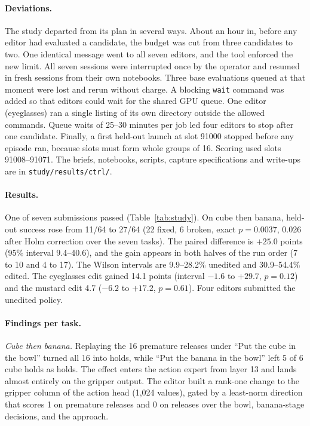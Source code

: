 \documentclass{article}
\begin{document}
\paragraph{Deviations.} The study departed from its plan in several ways. About an hour in, before any editor had evaluated a candidate, the budget was cut from three candidates to two. One identical message went to all seven editors, and the tool enforced the new limit. All seven sessions were interrupted once by the operator and resumed in fresh sessions from their own notebooks. Three base evaluations queued at that moment were lost and rerun without charge. A blocking \texttt{wait} command was added so that editors could wait for the shared GPU queue. One editor (eyeglasses) ran a single listing of its own directory outside the allowed commands. Queue waits of 25--30 minutes per job led four editors to stop after one candidate. Finally, a first held-out launch at slot 91000 stopped before any episode ran, because slots must form whole groups of 16. Scoring used slots 91008--91071. The briefs, notebooks, scripts, capture specifications and write-ups are in \texttt{study/results/ctrl/}.

\paragraph{Results.} One of seven submissions passed (Table~\ref{tab:study}). On cube then banana, held-out success rose from 11/64 to 27/64 (22 fixed, 6 broken, exact $p=0.0037$, 0.026 after Holm correction over the seven tasks). The paired difference is $+25.0$ points (95\% interval 9.4--40.6), and the gain appears in both halves of the run order (7 to 10 and 4 to 17). The Wilson intervals are 9.9--28.2\% unedited and 30.9--54.4\% edited. The eyeglasses edit gained 14.1 points (interval $-1.6$ to $+29.7$, $p=0.12$) and the mustard edit 4.7 ($-6.2$ to $+17.2$, $p=0.61$). Four editors submitted the unedited policy.

\paragraph{Findings per task.} \emph{Cube then banana.} Replaying the 16 premature releases under ``Put the cube in the bowl'' turned all 16 into holds, while ``Put the banana in the bowl'' left 5 of 6 cube holds as holds. The effect enters the action expert from layer 13 and lands almost entirely on the gripper output. The editor built a rank-one change to the gripper column of the action head (1,024 values), gated by a least-norm direction that scores 1 on premature releases and 0 on releases over the bowl, banana-stage decisions, and the approach.
\end{document}

